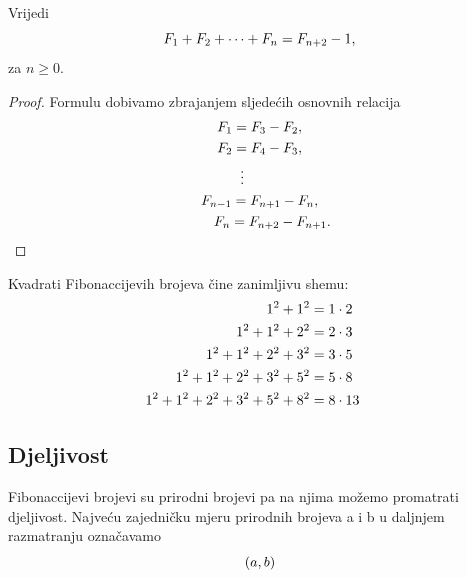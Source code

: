 \documentclass[14pt]{scrartcl}
\begin{document}
\begin{propozicija}
Vrijedi
\begin{equation}
F\sb{1}+F\sb{2}+\dots+F\sb{n}=F\sb{n+2}-1,
\end{equation}
za $n \geq 0$.
\end{propozicija}
\begin{proof}
Formulu dobivamo zbrajanjem sljede\'{c}ih osnovnih relacija
\begin{gather*}
F\sb{1} = F\sb{3}-F\sb{2},\\
F\sb{2} = F\sb{4}-F\sb{3},\\
\! \! \! \! \! \! \! \! \! \! \! \! \! \! \! \vdots\\
F\sb{n-1} = F\sb{n+1}-F\sb{n},\\
\qquad \! F\sb{n} = F\sb{n+2}-F\sb{n+1}.
\end{gather*}
\end{proof}

\begin{primjer}
Kvadrati Fibonaccijevih brojeva \v{c}ine zanimljivu shemu:
\begin{align}
1\sp{2}+1\sp{2}=1\cdot2\notag\\
1\sp{2}+1\sp{2}+2\sp{2}=2\cdot3\notag\\
1\sp{2}+1\sp{2}+2\sp{2}+3\sp{2}=3\cdot5\notag\\
1\sp{2}+1\sp{2}+2\sp{2}+3\sp{2}+5\sp{2}=5\cdot8\notag\\
1\sp{2}+1\sp{2}+2\sp{2}+3\sp{2}+5\sp{2}+8\sp{2}=8\cdot1&3\notag
\end{align}
\end{primjer}

\subsection{Djeljivost}
\vspace{5mm}

Fibonaccijevi brojevi su prirodni brojevi pa na njima mo\v{z}emo promatrati djeljivost.
Najve\'{c}u zajedni\v{c}ku mjeru prirodnih brojeva a i b u daljnjem razmatranju ozna\v{c}avamo
\begin{equation}
(a,b) \notag \\
\end{equation}
\end{document}
